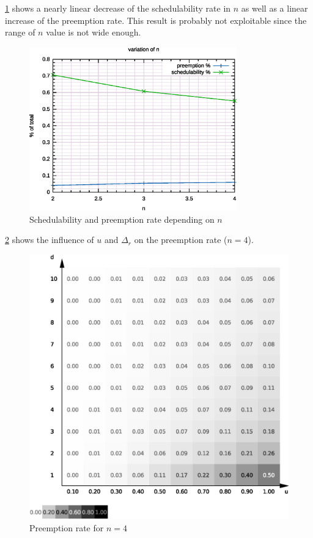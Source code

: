 \documentclass[a4paper,12pt]{article}
\begin{document}
\ref{fig:stu:an} shows a nearly linear decrease of the schedulability rate in $n$ as well as a linear increase of the preemption rate. This result is probably not exploitable since the range of $n$ value is not wide enough.

\begin{figure}
	\centering
	\includegraphics[width=0.8\textwidth]{../gnuplot/eps/3}
	\caption{\label{fig:stu:an} Schedulability and preemption rate depending on $n$}
\end{figure}

\ref{fig:stu:4p} shows the influence of $u$ and $\Delta_r$ on the preemption rate ($n = 4$).

\begin{figure}
	\centering
	\includegraphics[width=1\textwidth]{../mean/eps/4p}
	\caption{\label{fig:stu:4p} Preemption rate for $n = 4$}
\end{figure}
\end{document}
